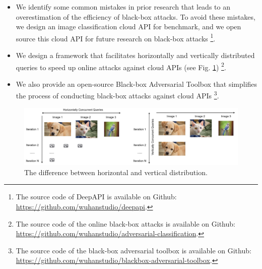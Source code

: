 \begin{itemize}
    \item We identify some common mistakes in prior research that leads to an overestimation of the efficiency of black-box attacks. To avoid these mistakes, we design an image classification cloud API for benchmark, and we open source this cloud API for future research on black-box attacks
    \footnote{The source code of DeepAPI is available on Github: \url{https://github.com/wuhanstudio/deepapi}.}.
    \item We design a framework that facilitates horizontally and vertically distributed queries to speed up online attacks against cloud APIs (see Fig. \ref{fig:distributability})
    \footnote{The source code of the online black-box attacks is available on Github: \url{https://github.com/wuhanstudio/adversarial-classification}.}. 
    \item We also provide an open-source Black-box Adversarial Toolbox that simplifies the process of conducting black-box attacks against cloud APIs
    \footnote{The source code of the black-box adversarial toolbox is available on Github: \url{https://github.com/wuhanstudio/blackbox-adversarial-toolbox}.}.
    
\end{itemize}

\begin{figure}[H]
    \centering
    \includegraphics[width=\linewidth]{figures/chapter_classification/distribution.jpg}
    \caption{The difference between horizontal and vertical distribution.}
    \label{fig:distributability}
\end{figure}


